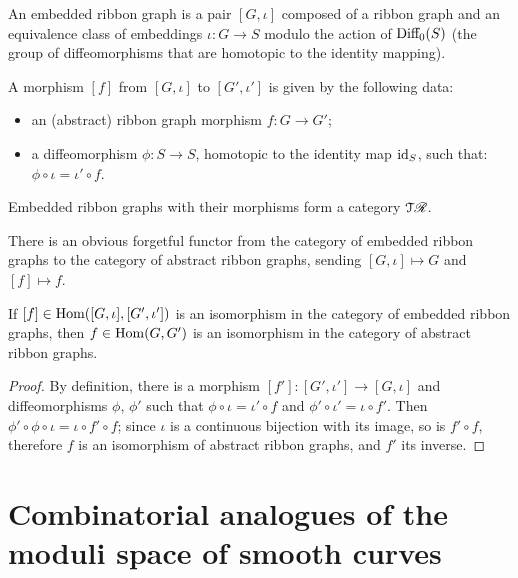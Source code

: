 \begin{definition}\label{dfn:embedded-rg}
  An embedded ribbon graph is a pair $[G, \iota]$ composed of a ribbon
  graph and an equivalence class of embeddings $\iota:G\to S$ modulo the
  action of $\textrm{Diff}_0(S)$ (the group of diffeomorphisms that are
  homotopic to the identity mapping).

  A morphism $[f]$ from $[G, \iota]$ to $[G', \iota']$ is given by the
  following data:
  \begin{itemize}
  \item an (abstract) ribbon graph morphism $f:G\to G'$;
  \item a diffeomorphism $\phi:S\to S$, homotopic to the identity map
    $\operatorname{id}_S$, such that: $\phi \circ \iota = \iota' \circ f$.
  \end{itemize}

  Embedded ribbon graphs with their morphisms form a category
  $\mathcal{T}\mathscr{R}_{}$. 
\end{definition}

There is an obvious forgetful functor from the category of embedded
ribbon graphs to the category of abstract ribbon graphs, sending $[G,
\iota] \mapsto G$ and $[f] \mapsto f$.

\begin{lemma}\label{lemma:morphism-of-embedded-rg}
  If $[f] \in \operatorname{Hom}([G,\iota], [G',\iota'])$ is an isomorphism in the category of
  embedded ribbon graphs, then $f\in\operatorname{Hom}(G,G')$ is an isomorphism in the
  category of abstract ribbon graphs.
\end{lemma}
\begin{proof}
  By definition, there is a morphism $[f']: [G',\iota'] \to [G,\iota]$ and
  diffeomorphisms $\phi$, $\phi'$ such that $\phi \circ \iota = \iota' \circ f$ and $\phi' \circ \iota' =
  \iota \circ f'$.  Then $\phi' \circ \phi \circ \iota = \iota \circ f' \circ f$; since $\iota$ is a continuous
  bijection with its image, so is $f' \circ f$, therefore $f$ is an
  isomorphism of abstract ribbon graphs, and $f'$ its inverse.
\end{proof}



\section{Combinatorial analogues of the moduli space of smooth curves}
\label{sec:mgn-comb}

